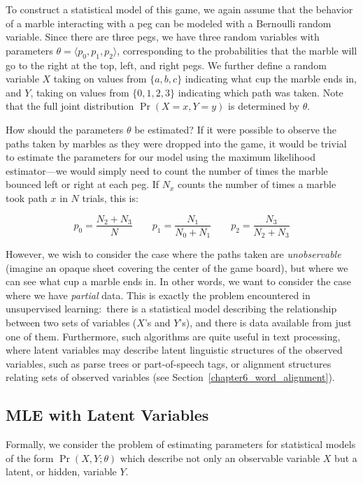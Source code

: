 To construct a statistical model of this game, we again assume that
the behavior of a marble interacting with a peg can be modeled with a
Bernoulli random variable.  Since there are three pegs, we have three
random variables with parameters $\theta=\langle p_0, p_1, p_2
\rangle$, corresponding to the probabilities that the marble will go
to the right at the top, left, and right pegs.  We further define a
random variable $X$ taking on values from $\{a,b,c\}$ indicating what
cup the marble ends in, and $Y$, taking on values from $\{0,1,2,3\}$
indicating which path was taken.  Note that the full joint
distribution $\Pr(X=x,Y=y)$ is determined by $\theta$.

How should the parameters $\theta$ be estimated?  If it were possible
to observe the paths taken by marbles as they were dropped into the
game, it would be trivial to estimate the parameters for our model
using the maximum likelihood estimator---we would simply need to count
the number of times the marble bounced left or right at each peg.  If
$N_x$ counts the number of times a marble took path $x$ in $N$ trials,
this is:

\begin{equation}
p_0 = \frac{N_2 + N_3}{N} \quad \quad p_1 = \frac{N_1}{N_0 + N_1} \quad \quad  p_2 = \frac{N_3}{N_2 + N_3}
\end{equation}

\noindent However, we wish to consider the case where the paths taken
are \emph{unobservable} (imagine an opaque sheet covering the center
of the game board), but where we can see what cup a marble ends in.
In other words, we want to consider the case where we have
\emph{partial} data.  This is exactly the problem encountered in
unsupervised learning:\ there is a statistical model describing the
relationship between two sets of variables ($X$'s and $Y$'s), and
there is data available from just one of them.  Furthermore, such
algorithms are quite useful in text processing, where latent variables
may describe latent linguistic structures of the observed variables,
such as parse trees or part-of-speech tags, or alignment structures
relating sets of observed variables (see
Section~\ref{chapter6_word_alignment}).

\subsection{MLE with Latent Variables}

Formally, we consider the problem of estimating parameters for
statistical models of the form $\Pr(X,Y;\theta)$ which describe not
only an observable variable $X$ but a latent, or hidden, variable $Y$.

